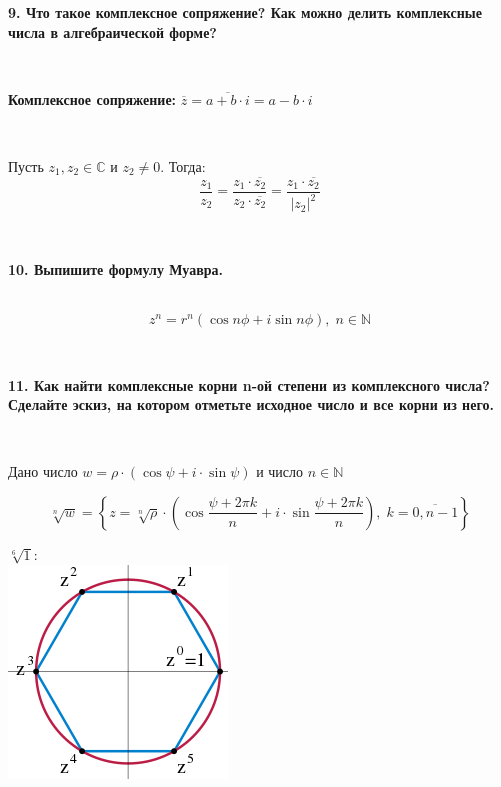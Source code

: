 \documentclass{article}
\begin{document}
	\textbf{9. Что такое комплексное сопряжение? Как можно делить комплексные числа в алгебраической форме?} 
	
	{
		$\;$
		\setlength{\parindent}{0.4cm}
		\hangindent=0.4cm
		
		\textbf{Комплексное сопряжение:} $\overline{z}=\overline{a+b\cdot i}=a-b\cdot i$
		
		$\;$
		
		Пусть $z_1, z_2 \in \mathbb{C}$ и $z_2 \ne 0$. Тогда:
		$$\dfrac{z_1}{z_2}=\dfrac{z_1\cdot\overline{z_2}}{z_2\cdot\overline{z_2}} = \dfrac{z_1\cdot\overline{z_2}}{|z_2|^2}$$
		
		$\;$
		\setlength{\parindent}{0cm}
		\hangindent=0cm
	}
	
	\textbf{10. Выпишите формулу Муавра.} 
	
	{
		$\;$
		\setlength{\parindent}{0.4cm}
		\hangindent=0.4cm
		$$z^n=r^n(\cos n\phi+i\sin n\phi),\; n\in\mathbb{N}$$
		
		$\;$
		\setlength{\parindent}{0cm}
		\hangindent=0cm
	}
	
	\newpage
	
	\textbf{11. Как найти комплексные корни n-ой степени из комплексного числа? Сделайте эскиз, на котором отметьте исходное число и все корни из него.} 
	
	{
		$\;$
		\setlength{\parindent}{0.4cm}
		\hangindent=0.4cm
		
		Дано число $w=\rho\cdot(\cos\psi+i\cdot \sin\psi)$ и число $n\in\mathbb{N}$
		
		$$\sqrt[n]{w}=\left\{z=\sqrt[n]{\rho}\cdot\left(\cos\frac{\psi+2\pi k}{n}+i\cdot\sin\frac{\psi+2\pi k}{n}\right), \; k=\overline{0, n-1}\right\} $$
		
		$\sqrt[6]{1}:$ \\
		\includegraphics[scale=0.7]{korni2.jpg}
		
		$\;$
		\setlength{\parindent}{0cm}
		\hangindent=0cm
	}
	
\end{document}
